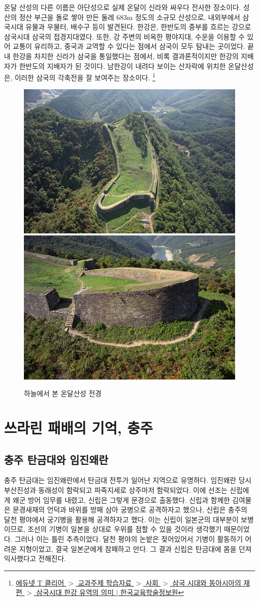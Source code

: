 온달 산성의 다른 이름은 아단성으로 실제 온달이 신라와 싸우다 전사한 장소이다. 
성산의 정산 부근을 돌로 쌓아 만든 둘레 683m 정도의 소규모 산성으로, 
내외부에서 삼국시대 유물과 우물터, 배수구 등이 발견된다. 
한강은, 한반도의 중부를 흐르는 강으로 삼국시대 삼국의 접경지대였다. 
또한, 강 주변의 비옥한 평야지대, 수운을 이용할 수 있어 교통이 유리하고, 중국과 교역할 수 있다는 점에서 삼국이 모두 탐내는 곳이었다.
끝내 한강을 차지한 신라가 삼국을 통일했다는 점에서, 비록 결과론적이지만
한강의 지배자가 한반도의 지배자가 된 것이다.
남한강이 내려다 보이는 산자락에 위치한 온달산성은, 
이러한 삼국의 각축전을 잘 보여주는 장소이다.
\footnote{\href{https://www.edunet.net/nedu/contsvc/viewWkstCont.do?clss_id=CLSS0000000362&menu_id=81&contents_id=1d7c0c64-bc0f-45e7-8f4d-82a7bb00cc97&svc_clss_id=CLSS0000072410&contents_openapi=naverdic}
{에듀넷 T 클리어 $>$ 교과주제 학습자료 $>$ 사회 $>$ 삼국 시대와 동아시아의 재편 $>$ 삼국시대 한강 유역의 의미 $|$ 한국교육학술정보원}}


\begin{figure}[ht]
    \centering
    \includegraphics[width=.4\textwidth]{s_img/온달산성_사진.JPG}
    \includegraphics[width=.4\textwidth]{s_img/온달산성_사진2.JPG}
    \caption{하늘에서 본 온달산성 전경}
    \label{fig:my_label_s5}
 \end{figure}

\section{쓰라린 패배의 기억, 충주}
\subsection{충주 탄금대와 임진왜란}
충주 탄금대는 임진왜란에서 탄금대 전투가 일어난 지역으로 유명하다. 임진왜란 당시 부산진성과 동래성이 함락되고 파죽지세로 상주마저 함락되었다. 이에 선조는 신립에게 왜군 방어 임무를 내렸고, 신립은 그렇게 문경으로 출동했다. 신립과 함께한 김여물은 문경새재의 언덕과 바위를 방패 삼아 궁병으로 공격하자고 했으나, 신립은 충주의 달천 평야에서 궁기병을 활용해 공격하자고 했다. 이는 신립이 일본군의 대부분이 보병이므로, 조선의 기병이 일본을 상대로 우위를 점할 수 있을 것이라 생각했기 때문이었다. 그러나 이는 틀린 추측이었다. 달천 평야의 논밭은 젖어있어서 기병이 활동하기 어려운 지형이었고, 결국 일본군에게 참패하고 만다. 그 결과 신립은 탄금대에 몸을 던져 익사했다고 전해진다. 
